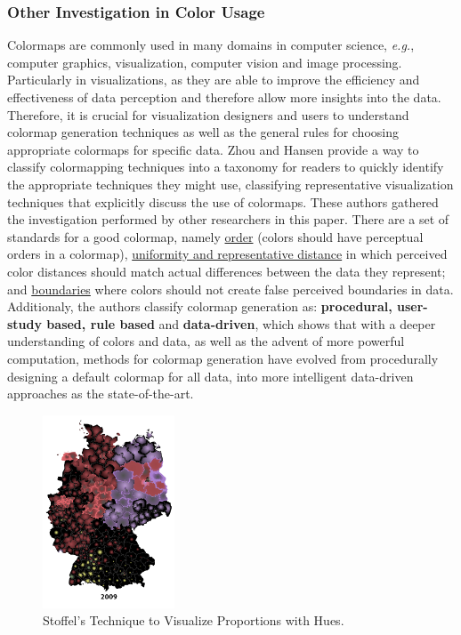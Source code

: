 \subsubsection{Other Investigation in Color Usage}
%
Colormaps are commonly used in many domains in computer science, \emph{e.g.}, computer graphics, visualization, computer vision and image processing.
Particularly in visualizations, as they are able to improve the efficiency and effectiveness of data perception and therefore allow more insights
into the data. Therefore, it is crucial for visualization designers and users to understand colormap generation techniques as well as the general
rules for choosing appropriate colormaps for specific data. Zhou and Hansen \cite{Zhou2016} provide a way to classify colormapping techniques into
a taxonomy for readers to quickly identify the appropriate techniques they might use, classifying representative visualization techniques that
explicitly discuss the use of colormaps. These authors gathered the investigation performed by other researchers in this paper. There are a set of
standards for a good colormap, namely \ul{order} (colors should have perceptual orders in a colormap), \ul{uniformity and representative distance}
in which perceived color distances should match actual differences between the data they represent; and \ul{boundaries} where colors should not
create false perceived boundaries in data. Additionaly, the authors classify colormap generation as: \textbf{procedural, user-study based, rule
based} and \textbf{data-driven}, which shows that with a deeper understanding of colors and data, as well as the advent of more powerful computation,
methods for colormap generation have evolved from procedurally designing a default colormap for all data, into more intelligent data-driven approaches
as the state-of-the-art. \par
%
\begin{figure}
	\centering
    \vspace{-10pt}
    \includegraphics[width=0.35\textwidth]{images/background/stoffel.png}
    \caption[Stoffel's Technique to Visualize Proportions with Hues.]{Stoffel's Technique to Visualize Proportions with Hues. \protect\cite{Stoffel2012}}
    \label{fig:stoffel}
\end{figure}
